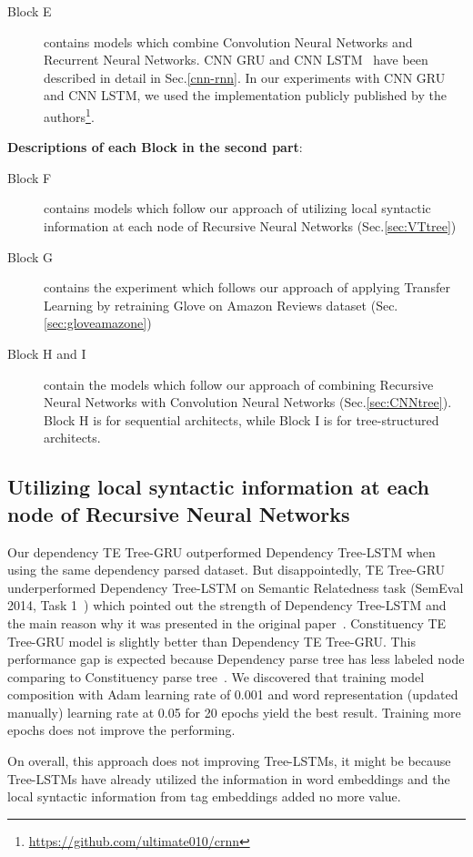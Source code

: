 \begin{description}
\item[Block E] contains models which combine Convolution Neural Networks and Recurrent Neural Networks.
CNN GRU and CNN LSTM~\cite{cnn-rnn} have been described in detail in Sec.\ref{cnn-rnn}.
In our experiments with CNN GRU and CNN LSTM, we used the implementation publicly published by the authors\footnote{\url{https://github.com/ultimate010/crnn}}.
\end{description}

\textbf{Descriptions of each Block in the second part}:
\begin{description}
\item[Block F] contains models which follow our approach of utilizing local syntactic information at each node of Recursive Neural Networks (Sec.\ref{sec:VTtree})
\item[Block G] contains the experiment which follows our approach of applying Transfer Learning by retraining Glove on Amazon Reviews dataset (Sec.\ref{sec:gloveamazone})
\item[Block H and I] contain the models which follow our approach of combining Recursive Neural Networks with Convolution Neural Networks (Sec.\ref{sec:CNNtree}).
Block H is for sequential architects, while Block I is for tree-structured architects.
\end{description}

\subsection{Utilizing local syntactic information at each node of Recursive Neural Networks}
Our dependency TE Tree-GRU outperformed Dependency Tree-LSTM when using the same dependency parsed dataset.
But disappointedly, TE Tree-GRU underperformed Dependency Tree-LSTM on Semantic Relatedness task (SemEval 2014, Task 1~\cite{SemeEvalTask1}) which pointed out the strength of Dependency Tree-LSTM and the main reason why it was presented in the original paper~\cite{treeLSTM}.
Constituency TE Tree-GRU model is slightly better than Dependency TE Tree-GRU.
This performance gap is expected because Dependency parse tree has less labeled node comparing to Constituency parse tree~\cite{treeLSTM}.
We discovered that training model composition with Adam learning rate of 0.001 and word representation (updated manually) learning rate at 0.05 for 20 epochs yield the best result.
Training more epochs does not improve the performing.

\label{unproved:tag-useless}
On overall, this approach does not improving Tree-LSTMs, it might be because Tree-LSTMs have already utilized the information in word embeddings and the local syntactic information from tag embeddings added no more value.


